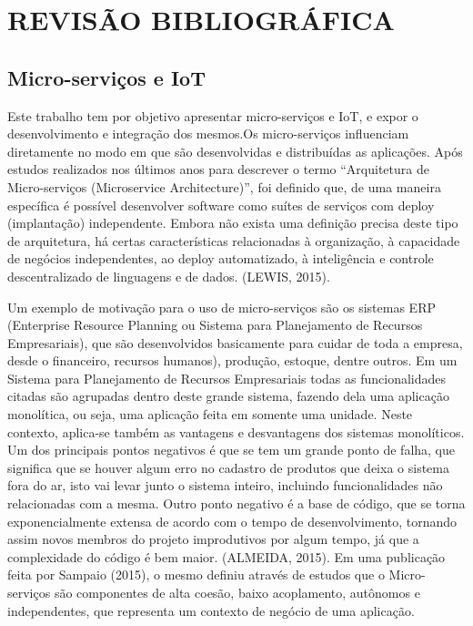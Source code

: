 \section{REVISÃO BIBLIOGRÁFICA}

\subsection{Micro-serviços e IoT}
Este trabalho tem por objetivo apresentar micro-serviços e IoT, e expor o desenvolvimento e integração dos mesmos.Os micro-serviços influenciam diretamente no modo em que são desenvolvidas e distribuídas as aplicações. Após estudos realizados nos últimos anos para descrever o termo “Arquitetura de Micro-serviços (Microservice Architecture)”, foi definido que, de uma maneira específica é possível desenvolver software como suítes de serviços com deploy (implantação) independente. Embora não exista uma definição precisa deste tipo de arquitetura, há certas características relacionadas à organização, à capacidade de negócios independentes, ao deploy automatizado, à inteligência e controle descentralizado de linguagens e de dados. (LEWIS, 2015).

Um exemplo de motivação para o uso de micro-serviços são os sistemas ERP (Enterprise Resource Planning ou Sistema para Planejamento de Recursos Empresariais), que são desenvolvidos basicamente para cuidar de toda a empresa, desde o financeiro, recursos humanos), produção, estoque, dentre outros. Em um Sistema para Planejamento de Recursos Empresariais todas as funcionalidades citadas são agrupadas dentro deste grande sistema, fazendo dela uma aplicação monolítica, ou seja, uma aplicação feita em somente uma unidade. Neste contexto, aplica-se também as vantagens e desvantagens dos sistemas monolíticos. Um dos principais pontos negativos é que se tem um grande ponto de falha, que significa que se houver algum erro no cadastro de produtos que deixa o sistema fora do ar, isto vai levar junto o sistema inteiro, incluindo funcionalidades não relacionadas com a mesma. Outro ponto negativo é a base de código, que se torna exponencialmente extensa de acordo com o tempo de desenvolvimento, tornando assim novos membros do projeto improdutivos por algum tempo, já que a complexidade do código é bem maior. (ALMEIDA, 2015). Em uma publicação feita por Sampaio (2015), o mesmo definiu através de estudos que o Micro-serviços são componentes de alta coesão, baixo acoplamento, autônomos e independentes, que representa um contexto de negócio de uma aplicação.

